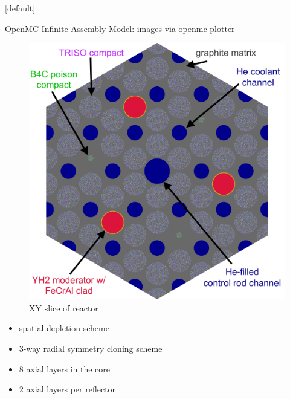 \documentclass[9pt,t,aspectratio=169]{beamer}
\makeatletter
\newenvironment{withoutheadline}{
       \setbeamertemplate{headline}[default]
       \def\beamer@entrycode{\vspace*{-\headheight}}
    }{}
\makeatother
\begin{document}
\begin{withoutheadline}
\begin{frame}{OpenMC Infinite Assembly Model: images via openmc-plotter \cite{openmc-plotter}}
\begin{minipage}[t]{0.45\linewidth}
\begin{figure}
            \includegraphics[height=0.8\textheight]{figures/gcmr_labeled_slice.png}
            \caption{XY slice of reactor}
        \end{figure}
    \end{minipage}
    \hfill%
    \begin{minipage}[t]{0.3\linewidth}
        \Large
        \begin{itemize}
            \item<4-> spatial depletion scheme
            \item<4-> 3-way radial symmetry cloning scheme
            \item<4-> 8 axial layers in the core
            \item<4-> 2 axial layers per reflector
        \end{itemize}
        \normalsize
    \end{minipage}
\end{frame}
\hypersetup{citecolor=black}
\end{withoutheadline}
\end{document}
